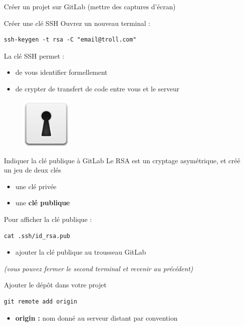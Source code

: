 \documentclass{beamer}
\begin{document}
\begin{frame}{Créer un projet sur GitLab}
	(mettre des captures d'écran)
\end{frame}

\begin{frame}[fragile]{Créer une clé SSH}
	Ouvrez un nouveau terminal :
	\begin{lstlisting}[frame=single]
		ssh-keygen -t rsa -C "email@troll.com"
	\end{lstlisting}
	
	La clé SSH permet :
	\begin{itemize}
		\item de vous identifier formellement
		\item de crypter de transfert de code entre vous et le serveur
	\end{itemize}
	\begin{figure}
  		\centering
 		\includegraphics[height=2.5cm]{img/keyhole}
	\end{figure}
\end{frame}

\begin{frame}[fragile]{Indiquer la clé publique à GitLab}
	Le RSA est un cryptage asymétrique, et créé un jeu de deux clés
	\begin{itemize}
		\item une clé privée
		\item une \textbf{clé publique}
	\end{itemize}
	
	Pour afficher la clé publique :
	\begin{lstlisting}[frame=single]
		cat .ssh/id_rsa.pub
	\end{lstlisting}
	\begin{itemize}
		\item ajouter la clé publique au trousseau GitLab
	\end{itemize}		
	\begin{center}
		\textit{(vous pouvez fermer le second terminal et revenir au précédent)}
	\end{center}
\end{frame}

\begin{frame}[fragile]{Ajouter le dépôt dans votre projet}
	\begin{lstlisting}[frame=single]
		git remote add origin
	\end{lstlisting}
	
	\begin{itemize}
		\item \textbf{origin :} nom donné au serveur distant par convention
	\end{itemize}
\end{frame}
\end{document}
